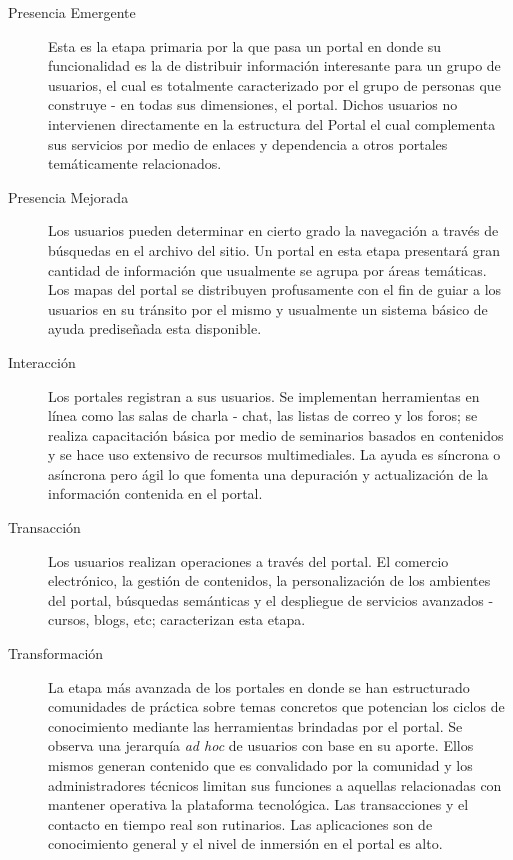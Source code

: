 \begin{description}
\item[Presencia Emergente]
Esta es la etapa primaria por la que pasa un portal en donde su funcionalidad es la de distribuir información interesante para un grupo de usuarios, el cual es totalmente caracterizado por el grupo de personas que construye - en todas sus dimensiones, el portal. Dichos usuarios no intervienen directamente en la estructura del Portal el cual complementa sus servicios por medio de enlaces y dependencia a otros portales temáticamente relacionados.

\item[Presencia Mejorada] 
Los usuarios pueden determinar en cierto grado la navegación a través de búsquedas en el archivo del sitio. Un portal en esta etapa presentará gran cantidad de información que usualmente se agrupa por áreas temáticas. Los mapas del portal se distribuyen profusamente con el fin de guiar a los usuarios en su tránsito por el mismo y usualmente un sistema básico de ayuda prediseñada esta disponible.
 
\item[Interacción]
Los portales registran a sus usuarios. Se implementan herramientas en línea como las salas de charla - chat, las listas de correo y los foros; se realiza capacitación básica por medio de seminarios basados en contenidos y se hace uso extensivo de recursos multimediales. La ayuda es síncrona o asíncrona pero ágil lo que fomenta una depuración y actualización de la información contenida en el portal.

\item[Transacción] 
Los usuarios realizan operaciones a través del portal. El comercio electrónico, la gestión de contenidos, la personalización de los ambientes del portal, búsquedas semánticas y el despliegue de servicios avanzados - cursos, blogs, etc; caracterizan esta etapa.

\item[Transformación] 
La etapa más avanzada de los portales en donde se han estructurado comunidades de práctica sobre temas concretos que potencian los ciclos de conocimiento mediante las herramientas brindadas por el portal. Se observa una jerarquía \textit{ad hoc} de usuarios con base en su aporte. Ellos mismos generan contenido que es convalidado por la comunidad y los administradores técnicos limitan sus funciones a aquellas relacionadas con mantener operativa la plataforma tecnológica. Las transacciones y el contacto en tiempo real son rutinarios. Las aplicaciones son de conocimiento general y el nivel de inmersión en el portal es alto.
\end{description}


